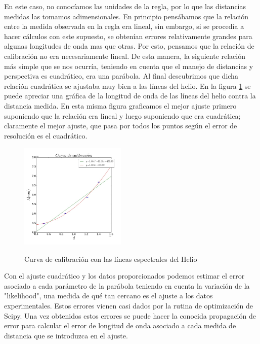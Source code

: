 \documentclass[%
 reprint,
 amsmath,amssymb,
 aps,
]{revtex4-1}
\begin{document}
En este caso, no conocíamos las unidades de la regla, por lo que las distancias medidas las tomamos adimensionales. En principio pensábamos que la relación entre la medida observada en la regla era lineal, sin embargo, si se procedía a hacer cálculos con este supuesto, se obtenían errores relativamente grandes para algunas longitudes de onda mas que otras. Por esto, pensamos que la relación de calibración no era necesariamente lineal. De esta manera, la siguiente relación más simple que se nos ocurría, teniendo en cuenta que el manejo de distancias y perspectiva es cuadrático, era una parábola. Al final descubrimos que dicha relación cuadrática se ajustaba muy bien a las líneas del helio. En la figura \ref{fig:calibre} se puede apreciar una gráfica de la longitud de onda de las líneas del helio contra la distancia medida. En esta misma figura graficamos el mejor ajuste primero suponiendo que la relación era lineal y luego suponiendo que era cuadrática; claramente el mejor ajuste, que pasa por todos los puntos según el error de resolución es el cuadrático.\\

\begin{figure}[h!]
\caption{Curva de calibración con las líneas espectrales del Helio}
\centering
\includegraphics[width=0.45\textwidth]{calibre}
\label{fig:calibre}
\end{figure}

Con el ajuste cuadrático y los datos proporcionados podemos estimar el error asociado a cada parámetro de la parábola teniendo en cuenta la variación de la "likelihood", una medida de qué tan cercano es el ajuste a los datos experimentales. Estos errores vienen casi dados por la rutina de optimización de Scipy. Una vez obtenidos estos errores se puede hacer la conocida propagación de error para calcular el error de longitud de onda asociado a cada medida de distancia que se introduzca en el ajuste.\\
\end{document}
